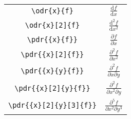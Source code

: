 \documentclass{jsarticle}
\renewcommand{\d}{\textrm{d}}
\begin{document}
%
\begin{table}[htpt]
\centering
\begin{tabular}{cc}
	\verb|\odr{x}{f}|				& $\displaystyle \frac{\d f}{\d x}$ \\[3mm]
	\verb|\odr{x}[2]{f}|			& $\displaystyle \frac{\d^2 f}{\d x^2}$ \\[3mm]
	\verb|\pdr{{x}{f}}|				& $\displaystyle \frac{\partial f}{\partial x}$ \\[3mm]
	\verb|\pdr{{x}[2]{f}}|			& $\displaystyle \frac{\partial^2 f}{\partial x^2}$ \\[3mm]
	\verb|\pdr{{x}{y}{f}}|			& $\displaystyle \frac{\partial^2 f}{\partial x \partial y}$ \\[3mm]
	\verb|\pdr{{x}[2]{y}{f}}|		& $\displaystyle \frac{\partial^2 f}{\partial x^2 \partial y}$ \\[3mm]
	\verb|\pdr{{x}[2]{y}[3]{f}}|	& $\displaystyle \frac{\partial^5 f}{\partial x^2 \partial y^3}$ \\[3mm]
\end{tabular}
\end{table}
\end{document}
